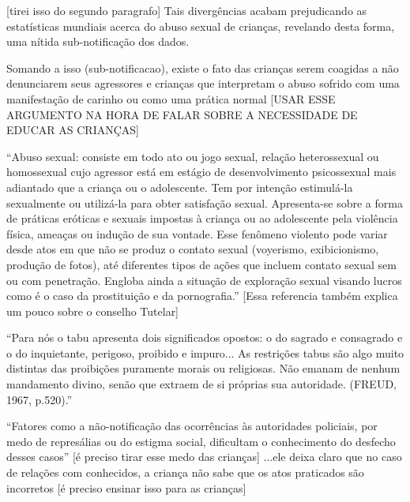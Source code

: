 [tirei isso do segundo paragrafo]
Tais divergências acabam prejudicando as estatísticas mundiais acerca do abuso sexual de crianças, revelando desta forma, uma nítida sub-notificação dos dados.



Somando a isso (sub-notificacao), existe o fato das crianças serem coagidas a não denunciarem seus agressores e crianças que interpretam o abuso sofrido com uma manifestação de carinho ou como uma prática normal [USAR ESSE ARGUMENTO NA HORA DE FALAR SOBRE A NECESSIDADE DE EDUCAR AS CRIANÇAS]
















``Abuso sexual: consiste em todo ato ou jogo sexual, relação heterossexual ou homossexual cujo agressor está em estágio de desenvolvimento psicossexual mais adiantado que a criança ou o adolescente. Tem por intenção estimulá-la sexualmente ou utilizá-la para obter satisfação sexual. Apresenta-se sobre a forma de práticas eróticas e sexuais impostas à criança ou ao adolescente pela violência física, ameaças ou indução de sua vontade. Esse fenômeno violento pode variar desde atos em que não se produz o contato sexual (voyerismo, exibicionismo, produção de fotos), até diferentes tipos de ações que incluem contato sexual sem ou com penetração. Engloba ainda a situação de exploração sexual visando lucros como é o caso da prostituição e da pornografia.'' \cite{saude2002notificacao} [Essa referencia também explica um pouco sobre o conselho Tutelar]


``Para nós o tabu apresenta dois significados opostos: o do sagrado e consagrado e o do inquietante, perigoso, proibido e impuro... As restrições tabus são algo muito distintas das proibições puramente morais ou religiosas. Não emanam de nenhum mandamento divino, senão que extraem de si próprias sua autoridade. (FREUD, 1967, p.520).''

``Fatores como a não-notificação das ocorrências às autoridades policiais, por medo de represálias ou do estigma social, dificultam o conhecimento do desfecho desses casos'' [é preciso tirar esse medo das crianças] \cite{aded2006abuso} ...ele deixa claro que no caso de relações com conhecidos, a criança não sabe que os atos praticados são incorretos [é preciso ensinar isso para as crianças]

